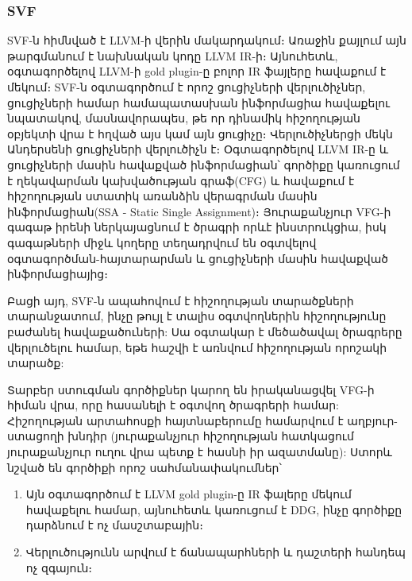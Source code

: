 \subsubsection{SVF}
SVF\cite{Sui2016}-ն հիմնված է LLVM-ի վերին մակարդակում։ Առաջին քայլում այն թարգմանում է նախնական կոդը LLVM IR-ի։
Այնուհետև, օգտագործելով LLVM-ի gold plugin-ը բոլոր IR ֆայլերը հավաքում է մեկում։ SVF-ն օգտագործում է որոշ ցուցիչների
վերլուծիչներ, ցուցիչների համար համապատասխան ինֆորմացիա հավաքելու նպատակով, մասնավորապես, թե որ դինամիկ հիշողության
օբյեկտի վրա է հղված այս կամ այն ցուցիչը։ Վերլուծիչներցի մեկն Անդերսենի ցուցիչների վերլուծիչն է\cite{Andersen}։
Օգտագործելով LLVM IR-ը և ցուցիչների մասին հավաքված ինֆորմացիան՝ գործիքը կառուցում է ղեկավարման կախվածության գրաֆ(CFG)
և հավաքում է հիշողության ստատիկ առանձին վերագրման մասին ինֆորմացիան(SSA - Static Single Assignment)։
Յուրաքանչյուր VFG-ի գագաթ իրենի ներկայացնում է ծրագրի որևէ ինստրուկցիա, իսկ գագաթների միջև կողերը տեղադրվում են
օգտվելով օգտագործման-հայտարարման և ցուցիչների մասին հավաքված ինֆորմացիայից։

Բացի այդ, SVF-ն ապահովում է հիշողության տարածքների տարանջատում, ինչը թույլ է տալիս օգտվողներին հիշողությունը բաժանել
հավաքածուների: Սա օգտակար է մեծածավալ ծրագրերը վերլուծելու համար, եթե հաշվի է առնվում հիշողության որոշակի տարածք:

Տարբեր ստուգման գործիքներ կարող են իրականացվել VFG-ի հիման վրա, որը հասանելի է օգտվող ծրագրերի համար:
Հիշողության արտահոսքի հայտնաբերումը համարվում է աղբյուր-ստացողի խնդիր (յուրաքանչյուր հիշողության հատկացում
յուրաքանչյուր ուղու վրա պետք է հասնի իր ազատմանը): Ստորև նշված են գործիքի որոշ սահմանափակումներ՝
\begin{enumerate}
    \item Այն օգտագործում է LLVM gold plugin-ը IR ֆալերը մեկում հավաքելու համար, այնուհետև կառուցում է DDG,
    ինչը գործիքը դարձնում է ոչ մասշտաբային։
    \item Վերլուծությունն արվում է ճանապարհների և դաշտերի հանդեպ ոչ զգայուն։
\end{enumerate}